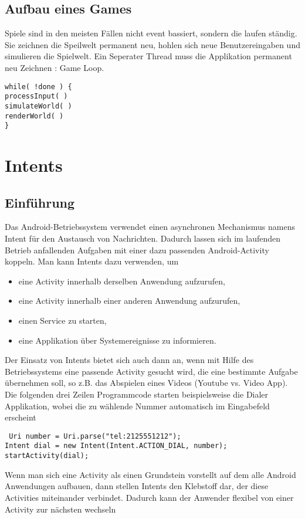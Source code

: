 \documentclass[a4paper,10pt,titlepage=false]{scrreprt}
\begin{document}
\section{Aufbau eines Games}
Spiele sind in den meisten Fällen nicht event bassiert, sondern die laufen ständig. Sie zeichnen die Speilwelt permanent neu, hohlen sich neue Benutzereingaben und simulieren die Spielwelt.
Ein Seperater Thread muss die Applikation permanent neu Zeichnen : Game Loop.
\begin{lstlisting}[caption=Game Loop]
while( !done ) {
processInput( )
simulateWorld( )
renderWorld( )
}

\end{lstlisting}
  
\chapter{Intents}
\section{Einführung}
Das Android-Betriebssystem verwendet einen asynchronen Mechanismus namens Intent für den
Austausch von Nachrichten. Dadurch lassen sich im laufenden Betrieb anfallenden Aufgaben mit
einer dazu passenden Android-Activity koppeln. Man kann Intents dazu verwenden, um
\begin{itemize}


 \item  eine Activity innerhalb derselben Anwendung aufzurufen,
 \item  eine Activity innerhalb einer anderen Anwendung aufzurufen,
 \item  einen Service zu starten,
 \item  eine Applikation über Systemereignisse zu informieren.
\end{itemize}
Der Einsatz von Intents bietet sich auch dann an, wenn mit Hilfe des Betriebssystems eine
passende Activity gesucht wird, die eine bestimmte Aufgabe übernehmen soll, so z.B. das Abspielen
eines Videos (Youtube vs. Video App). Die folgenden drei Zeilen Programmcode starten
beispielsweise die Dialer Applikation, wobei die zu wählende Nummer automatisch im Eingabefeld
erscheint



\begin{lstlisting}
 Uri number = Uri.parse("tel:2125551212");
Intent dial = new Intent(Intent.ACTION_DIAL, number);
startActivity(dial);
\end{lstlisting}
Wenn man sich eine Activity als einen Grundstein vorstellt auf dem alle Android Anwendungen
aufbauen, dann stellen Intents den Klebstoff dar, der diese Activities miteinander verbindet. Dadurch
kann der Anwender flexibel von einer Activity zur nächsten wechseln
\end{document}

